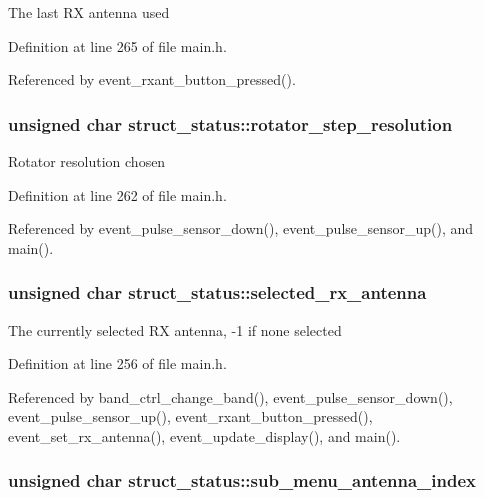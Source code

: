 The last RX antenna used 

Definition at line 265 of file main.h.

Referenced by event\_\-rxant\_\-button\_\-pressed().\hypertarget{structstruct__status_6a7f9fd7c692fe1ad0d0d9ed79b8d85b}{
\subsubsection[{rotator\_\-step\_\-resolution}]{\setlength{\rightskip}{0pt plus 5cm}unsigned char {\bf struct\_\-status::rotator\_\-step\_\-resolution}}}
\label{structstruct__status_6a7f9fd7c692fe1ad0d0d9ed79b8d85b}


Rotator resolution chosen 

Definition at line 262 of file main.h.

Referenced by event\_\-pulse\_\-sensor\_\-down(), event\_\-pulse\_\-sensor\_\-up(), and main().\hypertarget{structstruct__status_3e606ec5f1d11ef7e66c1e6f88ea43eb}{
\subsubsection[{selected\_\-rx\_\-antenna}]{\setlength{\rightskip}{0pt plus 5cm}unsigned char {\bf struct\_\-status::selected\_\-rx\_\-antenna}}}
\label{structstruct__status_3e606ec5f1d11ef7e66c1e6f88ea43eb}


The currently selected RX antenna, -1 if none selected 

Definition at line 256 of file main.h.

Referenced by band\_\-ctrl\_\-change\_\-band(), event\_\-pulse\_\-sensor\_\-down(), event\_\-pulse\_\-sensor\_\-up(), event\_\-rxant\_\-button\_\-pressed(), event\_\-set\_\-rx\_\-antenna(), event\_\-update\_\-display(), and main().\hypertarget{structstruct__status_da4ee4abf8490aa07c3f42bd4a2bb767}{
\subsubsection[{sub\_\-menu\_\-antenna\_\-index}]{\setlength{\rightskip}{0pt plus 5cm}unsigned char {\bf struct\_\-status::sub\_\-menu\_\-antenna\_\-index}}}
\label{structstruct__status_da4ee4abf8490aa07c3f42bd4a2bb767}


